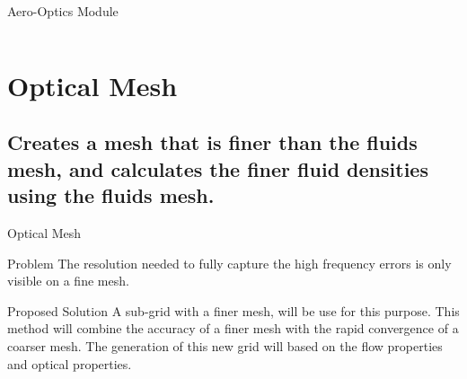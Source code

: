     \begin{frame}{Aero-Optics Module}
        \begin{minipage}{\textwidth}
            \linespread{1.4}
            \tableofcontents%
        \end{minipage}
    \end{frame}

    \begin{frame}{$ $ }
        \Huge {}
    \end{frame}

    \section{Optical Mesh}
    \subsection{Creates a mesh that is finer than the fluids mesh, and calculates the finer fluid densities using the fluids mesh. \\}
    \begin{frame}{Optical Mesh}
        \begin{block}{Problem}
            The resolution needed to fully capture the high frequency errors is only visible on a fine mesh.     
        \end{block}
        \begin{exampleblock}{Proposed Solution}
            A sub-grid with a finer mesh, will be use for this purpose. This method will combine the accuracy of a finer mesh with the rapid convergence of a coarser mesh. The generation of this new grid will based on the flow properties and optical properties.  
        \end{exampleblock}
    \end{frame}

